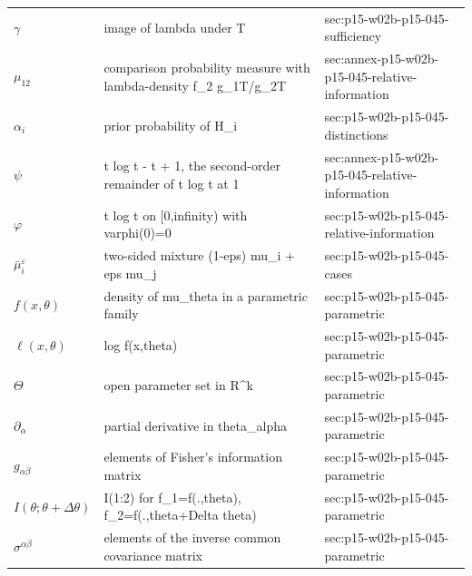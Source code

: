 \begin{longtable}{@{}p{}p{}p{}@{}}
\(\gamma\) & image of lambda under T & sec:\allowbreak{}p15-\allowbreak{}w02b-\allowbreak{}p15-\allowbreak{}045-\allowbreak{}sufficiency \\
\(\mu_{12}\) & comparison probability measure with lambda-density f\_2 g\_1T/g\_2T & sec:\allowbreak{}annex-\allowbreak{}p15-\allowbreak{}w02b-\allowbreak{}p15-\allowbreak{}045-\allowbreak{}relative-\allowbreak{}information \\
\(\alpha_i\) & prior probability of H\_i & sec:\allowbreak{}p15-\allowbreak{}w02b-\allowbreak{}p15-\allowbreak{}045-\allowbreak{}distinctions \\
\(\psi\) & t log t - t + 1, the second-order remainder of t log t at 1 & sec:\allowbreak{}annex-\allowbreak{}p15-\allowbreak{}w02b-\allowbreak{}p15-\allowbreak{}045-\allowbreak{}relative-\allowbreak{}information \\
\(\varphi\) & t log t on [0,infinity) with varphi(0)=0 & sec:\allowbreak{}p15-\allowbreak{}w02b-\allowbreak{}p15-\allowbreak{}045-\allowbreak{}relative-\allowbreak{}information \\
\(\bar\mu_i^\varepsilon\) & two-sided mixture (1-eps) mu\_i + eps mu\_j & sec:\allowbreak{}p15-\allowbreak{}w02b-\allowbreak{}p15-\allowbreak{}045-\allowbreak{}cases \\
\(f(x,\allowbreak \theta)\) & density of mu\_theta in a parametric family & sec:\allowbreak{}p15-\allowbreak{}w02b-\allowbreak{}p15-\allowbreak{}045-\allowbreak{}parametric \\
\(\ell(x,\allowbreak \theta)\) & log f(x,theta) & sec:\allowbreak{}p15-\allowbreak{}w02b-\allowbreak{}p15-\allowbreak{}045-\allowbreak{}parametric \\
\(\Theta\) & open parameter set in R\^{}k & sec:\allowbreak{}p15-\allowbreak{}w02b-\allowbreak{}p15-\allowbreak{}045-\allowbreak{}parametric \\
\(\partial_\alpha\) & partial derivative in theta\_alpha & sec:\allowbreak{}p15-\allowbreak{}w02b-\allowbreak{}p15-\allowbreak{}045-\allowbreak{}parametric \\
\(g_{\alpha\beta}\) & elements of Fisher's information matrix & sec:\allowbreak{}p15-\allowbreak{}w02b-\allowbreak{}p15-\allowbreak{}045-\allowbreak{}parametric \\
\(I(\theta;\allowbreak \theta+\Delta\theta)\) & I(1:2) for f\_1=f(.,theta), f\_2=f(.,theta+Delta theta) & sec:\allowbreak{}p15-\allowbreak{}w02b-\allowbreak{}p15-\allowbreak{}045-\allowbreak{}parametric \\
\(\sigma^{\alpha\beta}\) & elements of the inverse common covariance matrix & sec:\allowbreak{}p15-\allowbreak{}w02b-\allowbreak{}p15-\allowbreak{}045-\allowbreak{}parametric \\

\end{longtable}
